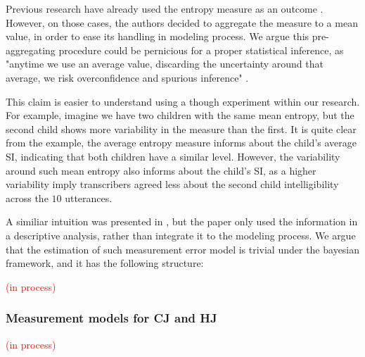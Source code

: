 Previous research have already used the entropy measure as an outcome \citep{Boonen_et_al_2021, Faes_et_al_2021}. However, on those cases, the authors decided to aggregate the measure to a mean value, in order to ease its handling in modeling process. We argue this pre-aggregating procedure could be pernicious for a proper statistical inference, as "anytime we use an average value, discarding the uncertainty around that average, we risk overconfidence and spurious inference" \citep{McElreath_2020}. 

This claim is easier to understand using a though experiment within our research. For example, imagine we have two children with the same mean entropy, but the second child shows more variability in the measure than the first. It is quite clear from the example, the average entropy measure informs about the child's average SI, indicating that both children have a similar level. However, the variability around such mean entropy also informs about the child's SI, as a higher variability imply transcribers agreed less about the second child intelligibility across the $10$ utterances. 

A similiar intuition was presented in \citet{Boonen_et_al_2021}, but the paper only used the information in a descriptive analysis, rather than integrate it to the modeling process. We argue that the estimation of such measurement error model is trivial under the bayesian framework, and it has the following structure:

\textcolor{red}{(in process)}

\begin{comment}
- Normal measurement error model: 
entropy_j ~ N( entropy_true_j, sigma_e) 

- In (Faes_et_al_2021) they use a random effects model for the entropy. 
entropy_j = entropy_true_j + error 
error ~ N( 0, sigma_e) 
* Notice both are the same (priors for entropy_true_j are needed) 

- Beta measurement error model: 
entropy_j ~ beta(alpha, beta) 
alpha = mu*M        ->  mu = alpha / M (mean) 
beta = (1 - mu)*M  ->  M = alpha + beta (prior sample size) 
* where mu = entropy_true_j and M is a distribution centered in 10 (utterances) 
\end{comment}
%
%
\subsubsection{Measurement models for CJ and HJ}
%
\textcolor{red}{(in process)}


